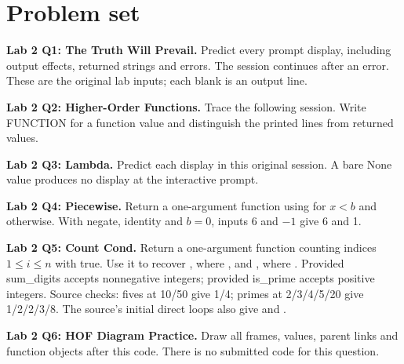 \section{Problem set}
\begin{prob}
\textbf{Lab 2 Q1: The Truth Will Prevail.} Predict every prompt display, including output effects, returned strings and errors. The session continues after an error. These are the original lab inputs; each blank is an output line.

\end{prob}
\begin{prob}
\textbf{Lab 2 Q2: Higher-Order Functions.} Trace the following session. Write FUNCTION for a function value and distinguish the printed lines from returned values.

\end{prob}
\begin{prob}
\textbf{Lab 2 Q3: Lambda.} Predict each display in this original session. A bare None value produces no display at the interactive prompt.

\end{prob}
\begin{prob}
\textbf{Lab 2 Q4: Piecewise.} Return a one-argument function using  for $x<b$ and  otherwise. With negate, identity and $b=0$, inputs 6 and $-1$ give 6 and 1.\par
{}
\end{prob}
\begin{prob}
\textbf{Lab 2 Q5: Count Cond.} Return a one-argument function counting indices $1\le i\le n$ with  true. Use it to recover , where , and , where . Provided sum\_digits accepts nonnegative integers; provided is\_prime accepts positive integers. Source checks: fives at 10/50 give 1/4; primes at 2/3/4/5/20 give 1/2/2/3/8. The source's initial direct loops also give  and .\par
{}
\end{prob}
\begin{prob}
\textbf{Lab 2 Q6: HOF Diagram Practice.} Draw all frames, values, parent links and function objects after this code. There is no submitted code for this question.
\end{prob}
